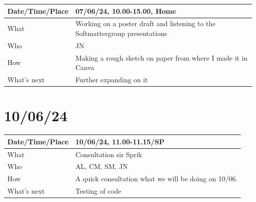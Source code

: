 \documentclass{article}
\begin{document}
\begin{table}[H]
\begin{tabular}{|p{1.5in}|p{4in}|}
\hline
Date/Time/Place & 07/06/24, 10.00-15.00, Home \\ \hline
What            & Working on a poster draft and listening to the Softmattergroup presentations \\ \hline
Who             & JN \\ \hline
How             & Making a rough sketch on paper from where I made it in Canva  \\ \hline
What's next     & Further expanding on it \\ \hline
\end{tabular}
\end{table}

\section{10/06/24}

\begin{table}[H]
\begin{tabular}{|p{1.5in}|p{4in}|}
\hline
Date/Time/Place &  10/06/24, 11.00-11.15/SP\\ \hline
What            &  Consultation sir Sprik\\ \hline
Who             &  AL, CM, SM, JN\\ \hline
How             &  A quick consultation what we will be doing on 10/06.  \\ \hline
What's next     &  Testing of code\\ \hline
\end{tabular}
\end{table}
\end{document}

